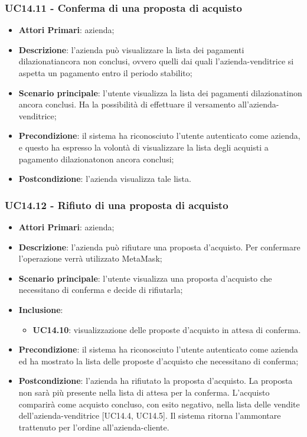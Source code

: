\subsubsection{UC14.11 - Conferma di una proposta di acquisto}
\begin{itemize}
	\item \textbf{Attori Primari}: azienda;
	\item \textbf{Descrizione}: l'azienda può visualizzare la lista dei pagamenti dilazionati\glosp ancora non conclusi, ovvero quelli dai quali l'azienda-venditrice si aspetta un pagamento entro il periodo stabilito;
	\item \textbf{Scenario principale}: l'utente visualizza la lista dei pagamenti dilazionati\glosp non ancora conclusi. Ha la possibilità di effettuare il versamento all'azienda-venditrice;
	\item \textbf{Precondizione}: il sistema ha riconosciuto l'utente autenticato come azienda, e questo ha espresso la volontà di visualizzare la lista degli acquisti a pagamento dilazionato\glosp non ancora conclusi;
	\item \textbf{Postcondizione}: l'azienda visualizza tale lista.
\end{itemize}

\subsubsection{UC14.12 - Rifiuto di una proposta di acquisto}
\begin{itemize}
	\item \textbf{Attori Primari}: azienda;
	\item \textbf{Descrizione}: l'azienda può rifiutare una proposta d'acquisto. Per confermare l'operazione verrà utilizzato MetaMask\glo;
	\item \textbf{Scenario principale}: l'utente visualizza una proposta d'acquisto che necessitano di conferma e decide di rifiutarla;
		\item \textbf{Inclusione}: 
	\begin{itemize}
		\item \textbf{UC14.10}: visualizzazione delle proposte d'acquisto in attesa di conferma.
	\end{itemize}
	\item \textbf{Precondizione}: il sistema ha riconosciuto l'utente autenticato come azienda ed ha mostrato la lista delle proposte d'acquisto che necessitano di conferma;
	\item \textbf{Postcondizione}: l'azienda ha rifiutato la proposta d'acquisto. La proposta non sarà più presente nella lista di attesa per la conferma. L'acquisto comparirà come acquisto concluso, con esito negativo, nella lista delle vendite dell'azienda-venditrice [UC14.4, UC14.5]. Il sistema ritorna l'ammontare trattenuto per l'ordine all'azienda-cliente.
\end{itemize}

